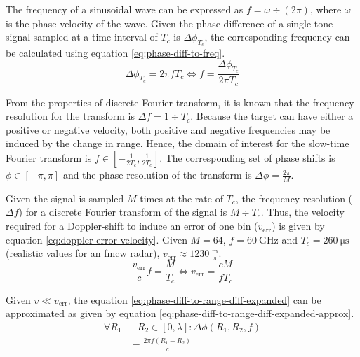 The frequency of a sinusoidal wave can be expressed as $f = \omega \div (2\pi)$,
where $\omega$ is the phase velocity of the wave.
Given the phase difference of a single-tone signal sampled 
at a time interval of $T_{c}$ is $\Delta \phi_{T_{c}}$,
the corresponding frequency can be calculated using equation \ref{eq:phase-diff-to-freq}.
\begin{equation}
    \label{eq:phase-diff-to-freq}
    \Delta \phi_{T_{c}} = 2 \pi f T_{c}
    \Leftrightarrow
    f = \frac{ \Delta \phi_{T_{c}} }{ 2\pi T_{c} }
\end{equation}

From the properties of discrete Fourier transform,
it is known that the frequency resolution for the transform is $\Delta f = 1 \div T_{c}$.
Because the target can have either a positive or negative velocity,
both positive and negative frequencies may be induced by the change in range.
Hence, the domain of interest for the slow-time Fourier transform is
$f \in [-\frac{1}{2T_{c}}, \frac{1}{2T_{c}}]$.
The corresponding set of phase shifts is $\phi \in [- \pi, \pi]$
and the phase resolution of the transform is $\Delta \phi = \frac{2\pi}{M}$.

Given the signal is sampled $M$ times at the rate of $T_{c}$,
the frequency resolution ($\Delta f$) for a discrete Fourier transform of the signal is $M \div T_{c}$.
Thus, the velocity required for a Doppler-shift to induce an error of one bin ($v_\mathrm{err}$)
is given by equation \ref{eq:doppler-error-velocity}.
Given $M = 64$, $f = 60~\mathrm{GHz}$ and $T_{c} = 260~\mathrm{\mu s}$
(realistic values for an \gls{fmcw} radar), $v_\mathrm{err} \approx 1230~\frac{\mathrm{m}}{\mathrm{s}}$.
\begin{equation}
    \label{eq:doppler-error-velocity}
    \frac{v_\mathrm{err}}{c}f = \frac{M}{T_{c}}
    \Leftrightarrow 
    v_\mathrm{err} = \frac{cM}{f T_{c}}
\end{equation}

Given $v \ll v_\mathrm{err}$, the equation \ref{eq:phase-diff-to-range-diff-expanded}
can be approximated as given by equation \ref{eq:phase-diff-to-range-diff-expanded-approx}.
\begin{equation}
    \label{eq:phase-diff-to-range-diff-expanded-approx}
    \begin{aligned}
        \forall R_1 &- R_2 \in [0, \lambda] : \Delta \phi(R_1, R_2 ,f) \\
        &= \frac {2\pi f (R_1-R_2)}{c}
    \end{aligned}
\end{equation}

